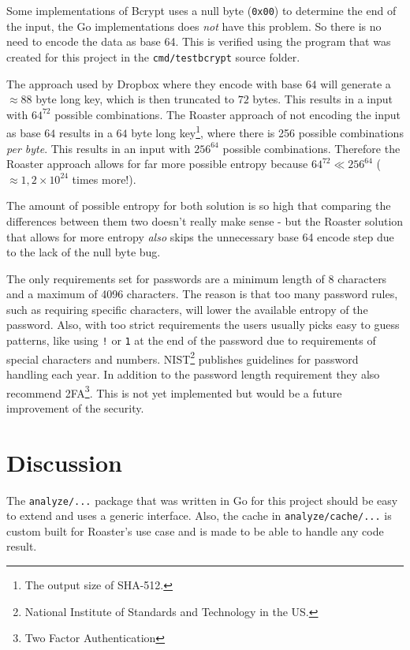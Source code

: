 \documentclass[12pt,a4paper]{report}
\begin{document}
Some implementations of Bcrypt uses a null byte (\texttt{0x00}) to determine the end
of the input\cite{bcrypt-bug}, the Go implementations does \textit{not} have this problem. So there
is no need to encode the data as base 64. This is verified using the program that was created for
this project in the \texttt{cmd/testbcrypt} source folder.

The approach used by Dropbox where they encode with base $64$ will generate a
$\approx 88$ byte long key, which is then truncated to $72$ bytes. This results in a
input with $64^{72}$ possible combinations. The Roaster approach of not encoding the
input as base $64$ results in a $64$ byte long key\footnote{The output size of SHA-512.},
where there is 256 possible combinations \textit{per byte}. This results in an input
with $256^{64}$ possible combinations. Therefore the Roaster approach allows for far more
possible entropy because $64^{72} \ll 256^{64}$ ($\approx 1,2 \times 10^{24}$ times more!).

The amount of possible entropy for both solution is so high that comparing the differences
between them two doesn't really make sense - but the Roaster solution that allows for more entropy
\textit{also} skips the unnecessary base 64 encode step due to the lack of the null byte bug.

The only requirements set for passwords are a minimum length of 8 characters and a maximum of 4096 characters. The reason is that too many password rules, such as requiring specific characters, will lower the available entropy of the password. Also, with too strict requirements the users usually picks easy to guess patterns, like using \texttt{!} or \texttt{1} at the end of the password due to requirements of special characters and numbers\cite{oauth-nist}. NIST\footnote{National Institute of Standards and Technology in the US.} publishes guidelines for password handling each year. In addition to the password length requirement they also recommend 2FA\footnote{Two Factor Authentication}\cite{nist-passwords}. This is not yet implemented but would be a future improvement of the security.

\chapter{Discussion}

The \texttt{analyze/...} package that was written in Go for this project should be easy to extend and uses a generic interface. Also, the cache in \texttt{analyze/cache/...} is custom built for Roaster's use case and is made to be able to handle any code result.
\end{document}
